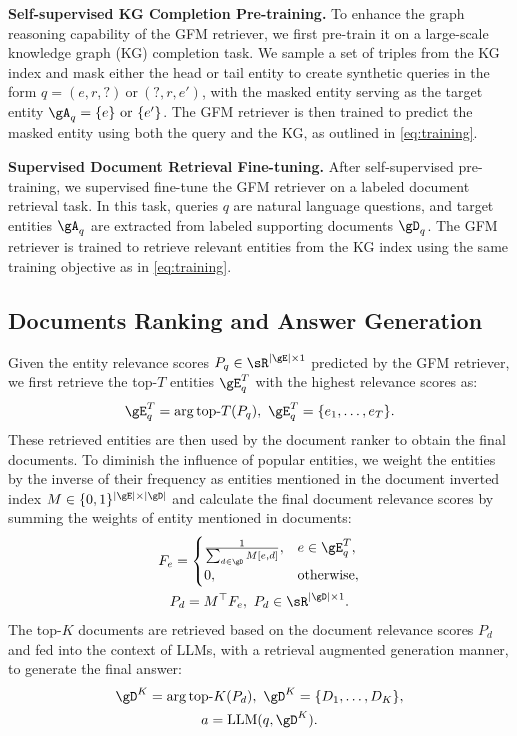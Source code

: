 \noindent\textbf{Self-supervised KG Completion Pre-training.} To enhance the graph reasoning capability of the GFM retriever, we first pre-train it on a large-scale knowledge graph (KG) completion task. We sample a set of triples from the KG index and mask either the head or tail entity to create synthetic queries in the form $q=(e,r,?)~\text{or}~(?, r, e')$, with the masked entity serving as the target entity $\gA_q = \{e\}~\text{or}~\{e'\}$. The GFM retriever is then trained to predict the masked entity using both the query and the KG, as outlined in \eqref{eq:training}.

\noindent\textbf{Supervised Document Retrieval Fine-tuning.} After self-supervised pre-training, we supervised fine-tune the GFM retriever on a labeled document retrieval task. In this task, queries $q$ are natural language questions, and target entities $\gA_q$ are extracted from labeled supporting documents $\gD_q$. The GFM retriever is trained to retrieve relevant entities from the KG index using the same training objective as in \eqref{eq:training}.

\subsection{Documents Ranking and Answer Generation}\label{sec:ranking}
Given the entity relevance scores $P_q\in\sR^{|\gE|\times 1}$ predicted by the GFM retriever, we first retrieve the top-$T$ entities $\gE_q^{T}$ with the highest relevance scores as:
\begin{equation}
    \gE_q^{T} = \arg\text{top-}T(P_q),~\gE_q^{T}=\{e_1,\ldots,e_T\}.\label{eq:top-T}
\end{equation}
These retrieved entities are then used by the document ranker to obtain the final documents. To diminish the influence of popular entities, we weight the entities by the inverse of their frequency as entities mentioned in the document inverted index $M \in \{0,1\}^{|\gE|\times|\gD|}$ and calculate the final document relevance scores by summing the weights of entity mentioned in documents:
{
\begin{gather}
    \setlength\abovedisplayskip{2pt}%
    \setlength\belowdisplayskip{2pt}
    F_e = \begin{cases}
        \frac{1}{\sum_{d\in\gD} M[e,d]}, & e\in\gE_q^{T}, \\
        0, & \text{otherwise},
    \end{cases}\label{eq:entity_weight} \\
    P_d = M^{\top}F_e,~P_d\in\sR^{|\gD|\times 1}.\label{eq:doc_score}
\end{gather}
The top-$K$ documents are retrieved based on the document relevance scores $P_d$ and fed into the context of LLMs, with a retrieval augmented generation manner, to generate the final answer:
\begin{gather}
    \setlength\abovedisplayskip{1pt}%
    \setlength\belowdisplayskip{1pt}
    \gD^K = \arg\text{top-}K(P_d),~\gD^K=\{D_1,\ldots,D_K\}, \\
    a = \text{LLM}(q,\gD^K).
\end{gather}
}